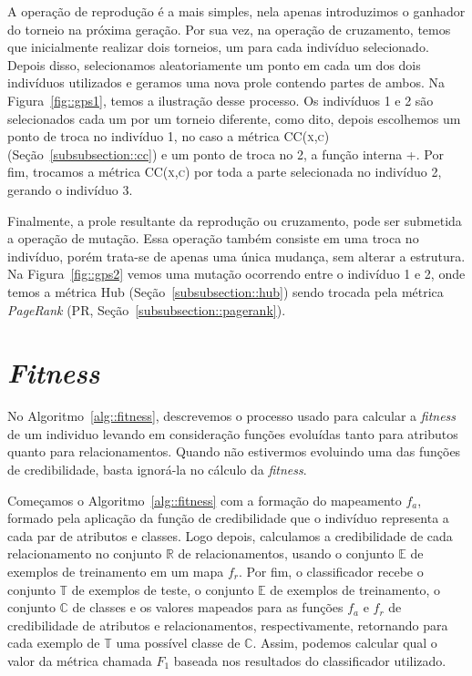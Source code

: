 A operação de reprodução é a mais simples, nela apenas introduzimos o ganhador do torneio na próxima geração. Por sua vez, na operação de cruzamento, temos que inicialmente realizar dois torneios, um para cada indivíduo selecionado. Depois disso, selecionamos aleatoriamente um ponto em cada um dos dois indivíduos utilizados e geramos uma nova prole contendo partes de ambos. Na Figura~\ref{fig::gps1}, temos a ilustração desse processo. 
Os indivíduos 1 e 2 são selecionados cada um por um torneio diferente, como dito, depois escolhemos um ponto de troca no indivíduo 1, no caso a métrica \textsc{CC(x,c)} (Seção~\ref{subsubsection::cc}) e um ponto de troca no 2, a função interna +. Por fim, trocamos a métrica \textsc{CC(x,c)} por toda a parte selecionada no indivíduo 2, gerando o indivíduo 3. 

Finalmente, a prole resultante da reprodução ou cruzamento, pode ser submetida a operação de mutação. Essa operação também consiste em uma troca no indivíduo, porém trata-se de apenas uma única mudança, sem alterar a estrutura. Na Figura~\ref{fig::gps2} vemos uma mutação ocorrendo entre o indivíduo 1 e 2, onde temos a métrica Hub (Seção~\ref{subsubsection::hub}) sendo trocada pela métrica \textit{PageRank} (\textsc{PR}, Seção~\ref{subsubsection::pagerank}).


\section{\textit{Fitness}}
\label{subsec::fitness}

No Algoritmo~\ref{alg::fitness}, descrevemos o processo usado para calcular a \textit{fitness} de um individuo levando em consideração funções evoluídas tanto para atributos quanto para relacionamentos.
Quando não estivermos evoluindo uma das funções de credibilidade, basta ignorá-la no cálculo da \textit{fitness}.

Começamos o Algoritmo~\ref{alg::fitness} com a formação do mapeamento $f_a$, formado pela aplicação da função de credibilidade que o indivíduo representa a cada par de atributos e classes.
Logo depois, calculamos a credibilidade de cada relacionamento no conjunto $\mathbb{R}$ de relacionamentos, usando o conjunto $\mathbb{E}$ de exemplos de treinamento em um mapa $f_r$.
Por fim, o classificador recebe o conjunto $\mathbb{T}$ de exemplos de teste, o conjunto $\mathbb{E}$ de exemplos de treinamento, o conjunto $\mathbb{C}$ de classes e os valores mapeados para as funções $f_a$ e $f_r$ de credibilidade de atributos e relacionamentos, respectivamente, retornando para cada exemplo de $\mathbb{T}$ uma possível classe de $\mathbb{C}$.
Assim, podemos calcular qual o valor da métrica chamada \textit{$F_1$} baseada nos resultados do classificador utilizado. 

